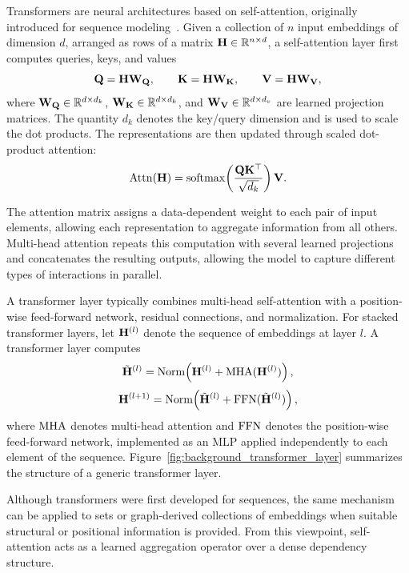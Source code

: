 Transformers are neural architectures based on self-attention, originally introduced for sequence modeling~\cite{vaswani_attention_2017}. Given a collection of $n$ input embeddings of dimension $d$, arranged as rows of a matrix $\mathbf{H}\in\mathbb{R}^{n\times d}$, a self-attention layer first computes queries, keys, and values
\begin{equation}
    \mathbf{Q} = \mathbf{H} \mathbf{W}_{\mathbf{Q}},
    \qquad
    \mathbf{K} = \mathbf{H} \mathbf{W}_{\mathbf{K}},
    \qquad
    \mathbf{V} = \mathbf{H} \mathbf{W}_{\mathbf{V}},
\end{equation}
where $\mathbf{W}_{\mathbf{Q}}\in\mathbb{R}^{d\times d_k}$, $\mathbf{W}_{\mathbf{K}}\in\mathbb{R}^{d\times d_k}$, and $\mathbf{W}_{\mathbf{V}}\in\mathbb{R}^{d\times d_v}$ are learned projection matrices. The quantity $d_k$ denotes the key/query dimension and is used to scale the dot products. The representations are then updated through scaled dot-product attention:
\begin{equation}
    \operatorname{Attn}(\mathbf{H})
    =
    \operatorname{softmax}\!\left(\frac{\mathbf{Q} \mathbf{K}^\top}{\sqrt{d_k}}\right)\mathbf{V}. 
\end{equation}

The attention matrix assigns a data-dependent weight to each pair of input elements, allowing each representation to aggregate information from all others. Multi-head attention repeats this computation with several learned projections and concatenates the resulting outputs, allowing the model to capture different types of interactions in parallel.

A transformer layer typically combines multi-head self-attention with a position-wise feed-forward network, residual connections, and normalization. For stacked transformer layers, let $\mathbf{H}^{(l)}$ denote the sequence of embeddings at layer $l$. A transformer layer computes
\begin{equation}
    \tilde{\mathbf{H}}^{(l)}
    =
    \operatorname{Norm}\!\left(
        \mathbf{H}^{(l)} + \operatorname{MHA}(\mathbf{H}^{(l)})
    \right),
\end{equation}
\begin{equation}
    \mathbf{H}^{(l+1)}
    =
    \operatorname{Norm}\!\left(
        \tilde{\mathbf{H}}^{(l)} + \operatorname{FFN}(\tilde{\mathbf{H}}^{(l)})
    \right),
\end{equation}
where $\operatorname{MHA}$ denotes multi-head attention and $\operatorname{FFN}$ denotes the position-wise feed-forward network, implemented as an MLP applied independently to each element of the sequence. Figure~\ref{fig:background_transformer_layer} summarizes the structure of a generic transformer layer.

Although transformers were first developed for sequences, the same mechanism can be applied to sets or graph-derived collections of embeddings when suitable structural or positional information is provided. From this viewpoint, self-attention acts as a learned aggregation operator over a dense dependency structure.

